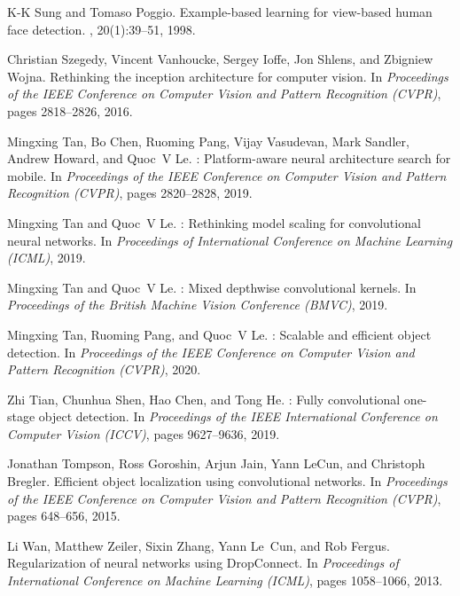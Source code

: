\documentclass[10pt,twocolumn,letterpaper]{article}
\begin{document}
{\begin{thebibliography}{100}
	K-K Sung and Tomaso Poggio.
	\newblock Example-based learning for view-based human face detection.
	, 20(1):39--51, 1998.
	
	Christian Szegedy, Vincent Vanhoucke, Sergey Ioffe, Jon Shlens, and Zbigniew
	Wojna.
	\newblock Rethinking the inception architecture for computer vision.
	\newblock In {\em Proceedings of the IEEE Conference on Computer Vision and
		Pattern Recognition (CVPR)}, pages 2818--2826, 2016.
	
	Mingxing Tan, Bo Chen, Ruoming Pang, Vijay Vasudevan, Mark Sandler, Andrew
	Howard, and Quoc~V Le.
	: Platform-aware neural architecture search for mobile.
	\newblock In {\em Proceedings of the IEEE Conference on Computer Vision and
		Pattern Recognition (CVPR)}, pages 2820--2828, 2019.
	
	Mingxing Tan and Quoc~V Le.
	: Rethinking model scaling for convolutional neural
	networks.
	\newblock In {\em Proceedings of International Conference on Machine Learning
		(ICML)}, 2019.
	
	Mingxing Tan and Quoc~V Le.
	: Mixed depthwise convolutional kernels.
	\newblock In {\em Proceedings of the British Machine Vision Conference (BMVC)},
	2019.
	
	Mingxing Tan, Ruoming Pang, and Quoc~V Le.
	: Scalable and efficient object detection.
	\newblock In {\em Proceedings of the IEEE Conference on Computer Vision and
		Pattern Recognition (CVPR)}, 2020.
	
	Zhi Tian, Chunhua Shen, Hao Chen, and Tong He.
	: Fully convolutional one-stage object detection.
	\newblock In {\em Proceedings of the IEEE International Conference on Computer
		Vision (ICCV)}, pages 9627--9636, 2019.
	
	Jonathan Tompson, Ross Goroshin, Arjun Jain, Yann LeCun, and Christoph Bregler.
	\newblock Efficient object localization using convolutional networks.
	\newblock In {\em Proceedings of the IEEE Conference on Computer Vision and
		Pattern Recognition (CVPR)}, pages 648--656, 2015.
	
	Li Wan, Matthew Zeiler, Sixin Zhang, Yann Le~Cun, and Rob Fergus.
	\newblock Regularization of neural networks using {DropConnect}.
	\newblock In {\em Proceedings of International Conference on Machine Learning
		(ICML)}, pages 1058--1066, 2013.
	

\end{thebibliography}}
\end{document}

